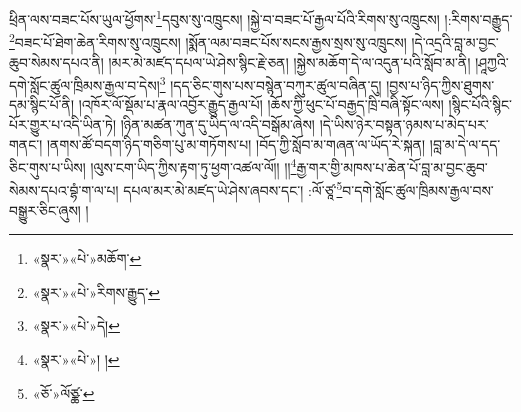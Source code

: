 ཕྲིན་ལས་བཟང་པོས་ཡུལ་ཕྱོགས་\footnote{«སྣར་»«པེ་»མཆོག་}དབུས་སུ་འཁྲུངས། །སྐྱེ་བ་བཟང་པོ་རྒྱལ་པོའི་རིགས་སུ་འཁྲུངས། །:རིགས་བརྒྱུད་\footnote{«སྣར་»«པེ་»རིགས་རྒྱུད་}བཟང་པོ་ཐེག་ཆེན་རིགས་སུ་འཁྲུངས། །སྨོན་ལམ་བཟང་པོས་སངས་རྒྱས་སྲས་སུ་འཁྲུངས། །དེ་འདྲའི་བླ་མ་བྱང་ཆུབ་སེམས་དཔའ་ནི། །མར་མེ་མཛད་དཔལ་ཡེ་ཤེས་སྙིང་རྗེ་ཅན། །སྐྱེས་མཆོག་དེ་ལ་འདུན་པའི་སློབ་མ་ནི། །ཤཱཀྱའི་དགེ་སློང་ཚུལ་ཁྲིམས་རྒྱལ་བ་དེས།\footnote{«སྣར་»«པེ་»དེ།} །དད་ཅིང་གུས་པས་བསྙེན་བཀུར་ཚུལ་བཞིན་དུ། །བྱས་པ་ཉིད་ཀྱིས་ཐུགས་དམ་སྙིང་པོ་ནི། །འཁོར་ལོ་སྡོམ་པ་རྣལ་འབྱོར་རྒྱུད་རྒྱལ་པོ། །ཆོས་ཀྱི་ཕུང་པོ་བརྒྱད་ཁྲི་བཞི་སྟོང་ལས། །སྙིང་པོའི་སྙིང་པོར་གྱུར་པ་འདི་ཡིན་ཏེ། །ཉིན་མཚན་ཀུན་དུ་ཡིད་ལ་འདི་བསྒོམ་ཞེས། །དེ་ཡིས་ཉེར་བསྟན་ཉམས་པ་མེད་པར་གནང་། །ནགས་ཚོ་བདག་ཉིད་གཅིག་པུ་མ་གཏོགས་པ། །བོད་ཀྱི་སློབ་མ་གཞན་ལ་ཡོད་རེ་སྐན། །བླ་མ་དེ་ལ་དད་ཅིང་གུས་པ་ཡིས། །ལུས་ངག་ཡིད་ཀྱིས་རྟག་ཏུ་ཕྱག་འཚལ་ལོ།། །།\footnote{«སྣར་»«པེ་»། །}རྒྱ་གར་གྱི་མཁས་པ་ཆེན་པོ་བླ་མ་བྱང་ཆུབ་སེམས་དཔའ་བྷཾ་ག་ལ་པ། དཔལ་མར་མེ་མཛད་ཡེ་ཤེས་ཞབས་དང་། :ལོ་ཙཱ་\footnote{«ཅོ་»ལོཙྪ་}བ་དགེ་སློང་ཚུལ་ཁྲིམས་རྒྱལ་བས་བསྒྱུར་ཅིང་ཞུས། ། 